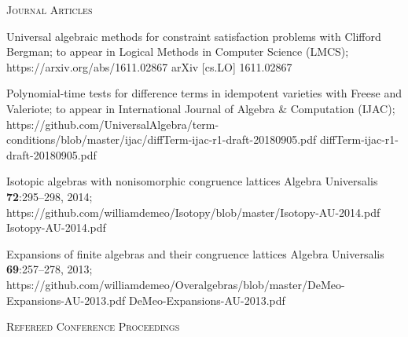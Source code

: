 \newcommand\mmskip{-6mm}




    \noindent    \textsc{Journal Articles}%

\begin{enumerate}
  \pubitem
  {Universal algebraic methods for constraint satisfaction problems}
  {with Clifford Bergman; to appear in}
  {Logical Methods in Computer Science {\small (LMCS)};}
  {}
  {https://arxiv.org/abs/1611.02867}
  {arXiv [cs.LO] 1611.02867}
  
  \pubitem
{Polynomial-time tests for difference terms in idempotent varieties}
{with Freese and Valeriote; to appear in}
{International Journal of Algebra \& Computation {\small (IJAC)};}
{}
{https://github.com/UniversalAlgebra/term-conditions/blob/master/ijac/diffTerm-ijac-r1-draft-20180905.pdf}
{diffTerm-ijac-r1-draft-20180905.pdf}


\pubitem 
{Isotopic algebras with nonisomorphic congruence lattices}
{}  %
{Algebra Universalis}
{\textbf{72}:295--298, 2014;} 
{https://github.com/williamdemeo/Isotopy/blob/master/Isotopy-AU-2014.pdf}
{Isotopy-AU-2014.pdf}


\pubitem 
{Expansions of finite algebras and their congruence lattices}
{}
{Algebra Universalis}
{\textbf{69}:257--278, 2013;}
{https://github.com/williamdemeo/Overalgebras/blob/master/DeMeo-Expansions-AU-2013.pdf}
{DeMeo-Expansions-AU-2013.pdf}

\end{enumerate}


\noindent    \textsc{Refereed Conference Proceedings}

